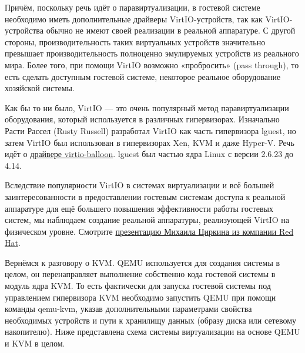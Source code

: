 \documentclass[14pt, a4paper]{article}
\begin{document}
Причём, поскольку речь идёт о паравиртуализации, в гостевой системе необходимо иметь
дополнительные драйверы VirtIO-устройств, так как VirtIO-устройства обычно не имеют своей
реализации в реальной аппаратуре. С другой стороны, производительность таких виртуальных
устройств значительно превышает производительность полноценно эмулируемых устройств из
реального мира. Более того, при помощи VirtIO возможно «пробросить» (pass through), то есть
сделать доступным гостевой системе, некоторое реальное оборудование хозяйской системы.

Как бы то ни было, VirtIO — это очень популярный метод паравиртуализации оборудования, который
используется в различных гипервизорах. Изначально Расти Рассел (Rusty Russell) разработал VirtIO
как часть гипервизора lguest, но затем VirtIO был использован в гипервизорах Xen, KVM и даже
Hyper-V. Речь идёт о \href{https://www.opennet.ru/opennews/art.shtml?num=51785}{драйвере virtio-balloon}. lguest был частью ядра Linux с версии 2.6.23 до 4.14.

Вследствие популярности VirtIO в системах виртуализации и всё большей заинтересованности в
предоставлении гостевым системам доступа к реальной аппаратуре для ещё большего повышения
эффективности работы гостевых систем, мы наблюдаем создание реальной аппаратуры,
реализующей VirtIO на физическом уровне. Смотрите \href{https://sched.co/TPe7}{презентацию Михаила Циркина из компании
Red Hat}. 

Вернёмся к разговору о KVM. QEMU используется для создания системы в целом, он перенаправляет
выполнение собственно кода гостевой системы в модуль ядра KVM. То есть фактически для запуска
гостевой системы под управлением гипервизора KVM необходимо запустить QEMU при помощи
команды qemu-kvm, указав дополнительными параметрами свойства необходимых устройств и пути к
хранилищу данных (образу диска или сетевому накопителю). Ниже представлена схема системы
виртуализации на основе QEMU и KVM в целом.\newpage
\end{document}
